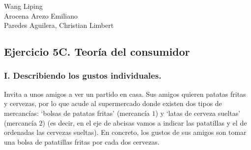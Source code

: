 Wang Liping\\
Arocena Arezo Emiliano\\
Paredes Aguilera, Christian Limbert\\

\subsection*{\center Ejercicio 5C. Teoría del consumidor}
\vspace{1cm}

\subsubsection*{\center I. Describiendo los gustos individuales.}
\vspace{.5cm}

Invita a unos amigos a ver un partido en casa. Sus amigos quieren patatas fritas y cervezas, por lo que acude al supermercado donde existen dos tipos de mercancías: $‘$bolsas de patatas fritas$’$ (mercancía $1$) y $‘$latas de cerveza sueltas$’$ (mercancía $2$) (es decir, en el eje de abcisas vamos a indicar las patatillas y el de ordenadas las cervezas sueltas). En concreto, los gustos de sus amigos son tomar una bolsa de patatillas fritas por cada dos cervezas.\\\\


